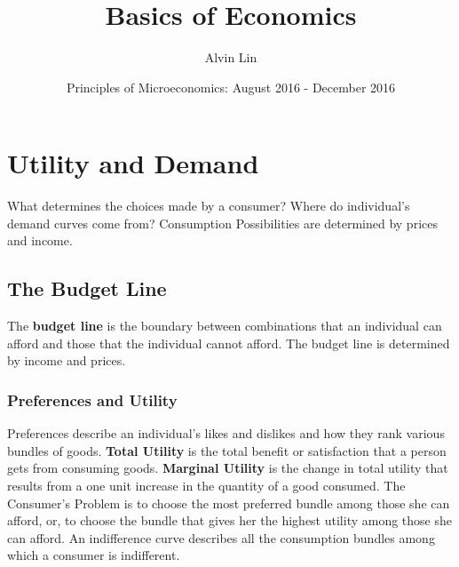 \documentclass{article}
\title{Basics of Economics}
\author{Alvin Lin}
\date{Principles of Microeconomics: August 2016 - December 2016}
\begin{document}
\maketitle

\section{Utility and Demand}
What determines the choices made by a consumer? Where do individual's demand
curves come from? Consumption Possibilities are determined by prices and
income.

\subsection{The Budget Line}
The \textbf{budget line} is the boundary between combinations that an
individual can afford and those that the individual cannot afford. The budget
line is determined by income and prices.

\subsubsection{Preferences and Utility}
Preferences describe an individual's likes and dislikes and how they rank
various bundles of goods. \textbf{Total Utility} is the total benefit or
satisfaction that a person gets from consuming goods. \textbf{Marginal
Utility} is the change in total utility that results from a one unit
increase in the quantity of a good consumed. The Consumer's Problem is to
choose the most preferred bundle among those she can afford, or, to choose
the bundle that gives her the highest utility among those she can afford.
An indifference curve describes all the consumption bundles among which
a consumer is indifferent.
\end{document}
